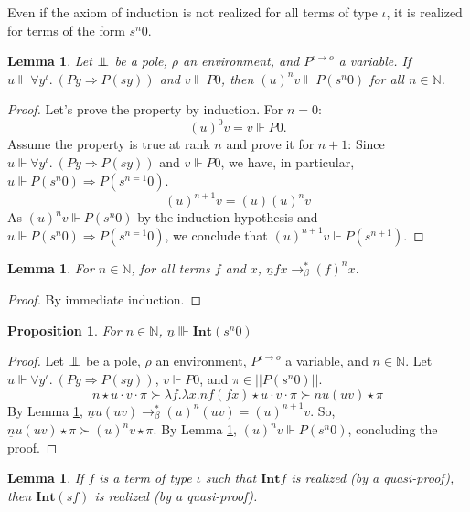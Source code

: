 \documentclass[a4paper,12pt]{article}
\newtheorem{prop}[theo]{Proposition}
\newtheorem{lem}[theo]{Lemma}
\theoremstyle{rmqstyle}
\newcommand{\N}{\mathbb{N}}
\newcommand{\abss}[1]{\lvert \lvert#1\rvert \rvert}
\renewcommand{\int}{\mathbf{Int}}
\renewcommand{\implies}{\Rightarrow}
\newcommand{\rbeta}{\longrightarrow_\beta}
\newcommand{\pole}{{\protect\mathpalette{\protect\polehelper}{\bot}}} \def\polehelper#1#2{\mathrel{\rlap{$#1#2$}\mkern3mu{#1#2}}}
\newcommand{\Kri}[1]{\underline{#1}}
\begin{document}
Even if the axiom of induction is not realized for all terms of type $\iota$, it is realized for terms of the form $s^n 0$.

\begin{lem}
\label{lem recu}
Let $\pole$ be a pole, $\rho$ an environment, and $P^{\iota \to o}$ a variable. If $u \Vdash \forall y^\iota. \ (Py \implies P(sy))$ and $v \Vdash P0$, then $(u)^n v \Vdash P(s^n 0)$ for all $n \in \N$.
\end{lem}

\begin{proof}
Let's prove the property by induction. For $n = 0$:
$$(u)^0 v = v \Vdash P0.$$
Assume the property is true at rank $n$ and prove it for $n+1$:
Since $u \Vdash \forall y^\iota. \ (Py \implies P(sy))$ and $v \Vdash P0$, we have, in particular, $u \Vdash P(s^n 0) \implies P(s^{n =1} 0)$. 
$$(u)^{n+1} v = (u) (u)^n v$$
As $(u)^n v \Vdash P(s^n 0)$ by the induction hypothesis and $u \Vdash P(s^n 0) \implies P(s^{n =1} 0)$, we conclude that $(u)^{n+1} v \Vdash P(s^{n+1})$.
\end{proof}

\begin{lem}
\label{lem kri}
For $n \in \N$, for all terms $f$ and $x$, $\Kri{n} f x \rbeta^* (f)^n x$.
\end{lem}

\begin{proof}
By immediate induction.
\end{proof}

\begin{prop}
For $n \in \N$, $\Kri{n} \Vvdash \int(s^n 0)$
\end{prop}

\begin{proof}
Let $\pole$ be a pole, $\rho$ an environment, $P^{\iota \to o}$ a variable, and $n \in \N$. Let $u \Vdash \forall y^\iota. \ (Py \implies P(sy))$, $v \Vdash P0$, and $\pi \in \abss{P(s^{n} 0)}$.  
$$\Kri{n} \star u \cdot v \cdot \pi \succ \lambda f. \lambda x. \Kri{n} f (f x) \star u \cdot v \cdot \pi \succ  \Kri{n} u (u v) \star \pi$$
By Lemma \ref{lem kri}, $\Kri{n} u (u v) \rbeta^* (u)^n (u v) = (u)^{n+1} v$. So, $\Kri{n} u (u v) \star \pi \succ (u)^n v \star \pi$. By Lemma \ref{lem recu}, $(u)^n v \Vdash P(s^n 0)$, concluding the proof.
\end{proof}

\begin{lem}
\label{lem suc}
If $f$ is a term of type $\iota$ such that $\int{f}$ is realized (by a quasi-proof), then $\int(sf)$ is realized (by a quasi-proof).
\end{lem}
\end{document}
